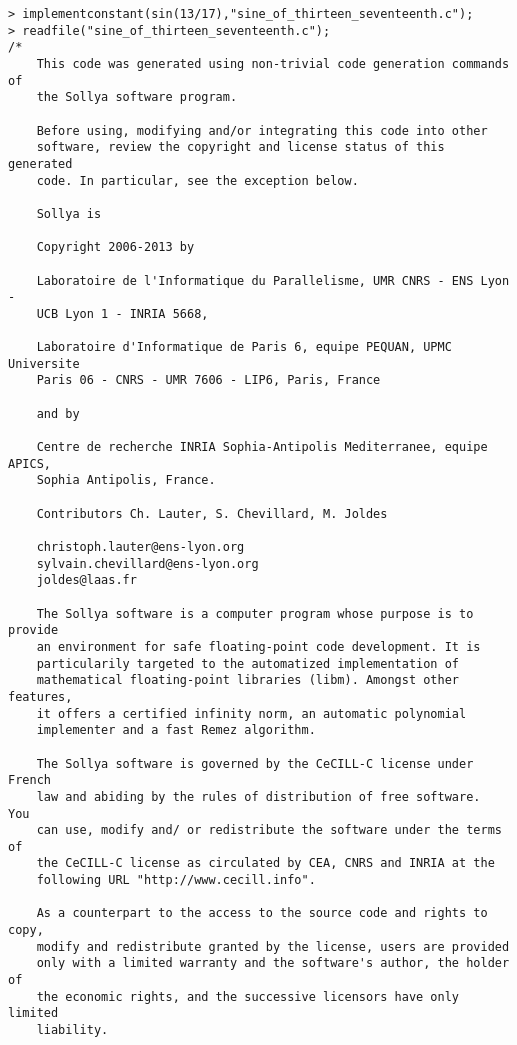 \begin{center}\begin{minipage}{15cm}\begin{Verbatim}[frame=single]
> implementconstant(sin(13/17),"sine_of_thirteen_seventeenth.c");
> readfile("sine_of_thirteen_seventeenth.c");
/*
    This code was generated using non-trivial code generation commands of
    the Sollya software program.
    
    Before using, modifying and/or integrating this code into other
    software, review the copyright and license status of this generated
    code. In particular, see the exception below.
    
    Sollya is
    
    Copyright 2006-2013 by
    
    Laboratoire de l'Informatique du Parallelisme, UMR CNRS - ENS Lyon -
    UCB Lyon 1 - INRIA 5668,
    
    Laboratoire d'Informatique de Paris 6, equipe PEQUAN, UPMC Universite
    Paris 06 - CNRS - UMR 7606 - LIP6, Paris, France
    
    and by
    
    Centre de recherche INRIA Sophia-Antipolis Mediterranee, equipe APICS,
    Sophia Antipolis, France.
    
    Contributors Ch. Lauter, S. Chevillard, M. Joldes
    
    christoph.lauter@ens-lyon.org
    sylvain.chevillard@ens-lyon.org
    joldes@laas.fr
    
    The Sollya software is a computer program whose purpose is to provide
    an environment for safe floating-point code development. It is
    particularily targeted to the automatized implementation of
    mathematical floating-point libraries (libm). Amongst other features,
    it offers a certified infinity norm, an automatic polynomial
    implementer and a fast Remez algorithm.
    
    The Sollya software is governed by the CeCILL-C license under French
    law and abiding by the rules of distribution of free software.  You
    can use, modify and/ or redistribute the software under the terms of
    the CeCILL-C license as circulated by CEA, CNRS and INRIA at the
    following URL "http://www.cecill.info".
    
    As a counterpart to the access to the source code and rights to copy,
    modify and redistribute granted by the license, users are provided
    only with a limited warranty and the software's author, the holder of
    the economic rights, and the successive licensors have only limited
    liability.
    

\end{Verbatim}
\end{minipage}
\end{center}

